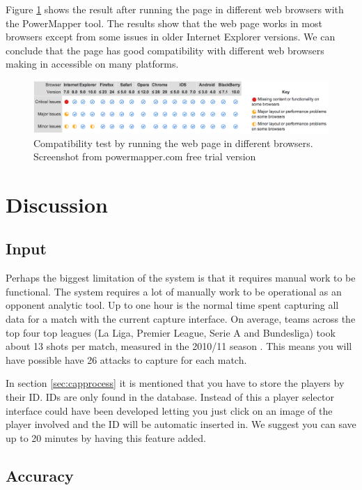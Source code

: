 Figure \ref{fig:compa} shows the result after running the page in different web browsers with the PowerMapper tool. The results show that the web page works in most browsers except from some issues in older Internet Explorer versions. We can conclude that the page has good compatibility with different web browsers making in accessible on many platforms.

\begin{figure}[ht!]
\centering
\includegraphics[width=1\textwidth]{images/evaluation/compa}
\caption{Compatibility test by running the web page in different browsers. Screenshot from powermapper.com free trial version}
\label{fig:compa}
\end{figure}

\section{Discussion}
\subsection{Input}

Perhaps the biggest limitation of the system is that it requires manual work to be functional. The system requires a lot of manually work to be operational as an opponent analytic tool. Up to one hour is the normal time spent capturing all data for a match with the current capture interface. On average, teams across the top four top leagues (La Liga, Premier League, Serie A and Bundesliga) took about 13 shots per match, measured in the 2010/11 season \cite{soccerbynumbers}. This means you will have possible have 26 attacks to capture for each match. 

In section \ref{sec:capprocess} it is mentioned that you have to store the players by their ID. IDs are only found in the database. Instead of this a player selector interface could have been developed letting you just click on an image of the player involved and the ID will be automatic inserted in. We suggest you can save up to 20 minutes by having this feature added.

\subsection{Accuracy}

